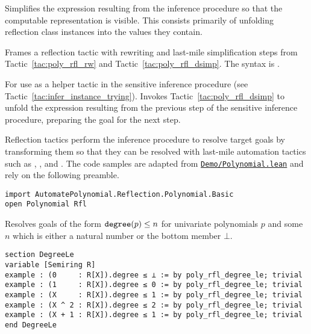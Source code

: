 \begin{tactic}
\label{tac:poly_rfl_dsimp}
\leanok
Simplifies the expression resulting from the inference procedure so that the computable representation is visible. This consists primarily of unfolding reflection class instances into the values they contain.
\end{tactic}

\begin{tactic}
\label{tac:poly_rfl_with}
\leanok
{}
Frames a reflection tactic  with rewriting and last-mile simplification steps from Tactic~\ref{tac:poly_rfl_rw} and Tactic~\ref{tac:poly_rfl_dsimp}. The syntax is \leaninline{ <:> }.
\end{tactic}

\begin{tactic}
\label{tac:poly_infer_try}
\leanok
{}
For use as a helper tactic in the sensitive inference procedure (see Tactic~\ref{tac:infer_instance_trying}). Invokes Tactic~\ref{tac:poly_rfl_dsimp} to unfold the expression resulting from the previous step of the sensitive inference procedure, preparing the goal for the next step.
\end{tactic}


Reflection tactics perform the inference procedure to resolve target goals by transforming them so that they can be resolved with last-mile automation tactics such as , , and . The code samples are adapted from \href{https://github.com/LiamSchilling/AutomatePolynomial/tree/master/AutomatePolynomial/Demo/Polynomial.lean}{\texttt{Demo/Polynomial.lean}} and rely on the following preamble.

\begin{lstlisting}
import AutomatePolynomial.Reflection.Polynomial.Basic
open Polynomial Rfl
\end{lstlisting}

\begin{tactic}
\label{tac:poly_rfl_degree_le}
\leanok
{}
Resolves goals of the form $\mathtt{degree}(p) \leq n$ for univariate polynomials $p$ and some $n$ which is either a natural number or the bottom member $\bot$.
\begin{lstlisting}
section DegreeLe
variable [Semiring R]
example : (0     : R[X]).degree ≤ ⊥ := by poly_rfl_degree_le; trivial
example : (1     : R[X]).degree ≤ 0 := by poly_rfl_degree_le; trivial
example : (X     : R[X]).degree ≤ 1 := by poly_rfl_degree_le; trivial
example : (X ^ 2 : R[X]).degree ≤ 2 := by poly_rfl_degree_le; trivial
example : (X + 1 : R[X]).degree ≤ 1 := by poly_rfl_degree_le; trivial
end DegreeLe
\end{lstlisting}
\end{tactic}

